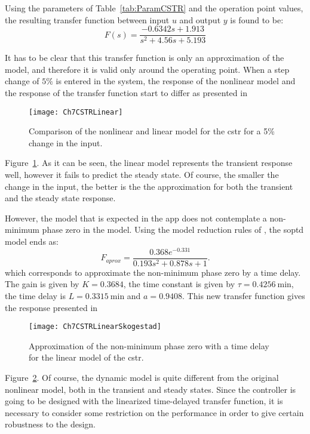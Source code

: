 Using the parameters of Table~\ref{tab:ParamCSTR} and the operation point values, the resulting transfer function between input $u$ and output $y$ is found to be:
\begin{equation}
	F(s) = \frac{-0.6342 s + 1.913}{s^2 + 4.56 s + 5.193}
	\label{eq:TFCSTR}
\end{equation}

It has to be clear that this transfer function is only an approximation of the model, and therefore it is valid only around the operating point. When a step change of $5\%$ is entered in the system, the response of the nonlinear model and the response of the transfer function start to differ as presented in %
%
\begin{figure}[tb]
	\centering
	\texttt{[image: Ch7CSTRLinear]}
	\caption{Comparison of the nonlinear and linear model for the \gls{cstr} for a 5\% change in the input.}
	\label{fig:Ch7CSTRLinear}
\end{figure}
%
Figure~\ref{fig:Ch7CSTRLinear}. As it can be seen, the linear model represents the transient response well, however it fails to predict the steady state. Of course, the smaller the change in the input, the better is the the approximation for both the transient and the steady state response.

However, the model that is expected in the \matlab app does not contemplate a non-minimum phase zero in the model. Using the model reduction rules of \citet{Skogestad2003}, the \gls{soptd} model ends as:
\begin{equation}
	F_{aprox} = \frac{0.368 e^{-0.331}}{0.193 s^2 + 0.878 s +1}.
	\label{eq:Faprox}
\end{equation}
which corresponds to approximate the non-minimum phase zero by a time delay. The gain is given by $K=0.3684$, the time constant is given by $\tau= \SI{0.4256}{\minute}$, the time delay is $L= \SI{0.3315}{\minute}$ and $a = 0.9408$. This new transfer function gives the response presented in %
\begin{figure}[tb]
	\centering
	\texttt{[image: Ch7CSTRLinearSkogestad]}
	\caption{Approximation of the non-minimum phase zero with a time delay for the linear model of the \gls{cstr}.}
	\label{fig:Ch7CSTRLinearSkogestad}
\end{figure}
%
Figure~\ref{fig:Ch7CSTRLinearSkogestad}. Of course, the dynamic model is quite different from the original nonlinear model, both in the transient and steady states. Since the controller is going to be designed with the linearized time-delayed transfer function, it is necessary to consider some restriction on the performance in order to give certain robustness to the design.

